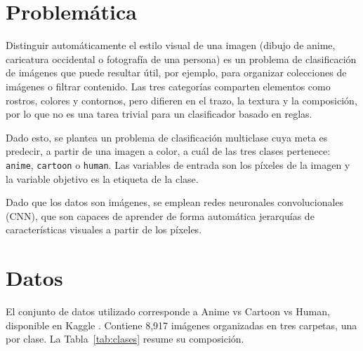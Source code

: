 \documentclass[letterpaper, 10 pt]{IEEEconf}
\begin{document}

\section{Problemática}

Distinguir automáticamente el estilo visual de una imagen (dibujo de anime, caricatura occidental o fotografía de una persona) es un problema de clasificación de imágenes que puede resultar útil, por ejemplo, para organizar colecciones de imágenes o filtrar contenido. Las tres categorías comparten elementos como rostros, colores y contornos, pero difieren en el trazo, la textura y la composición, por lo que no es una tarea trivial para un clasificador basado en reglas.

Dado esto, se plantea un problema de clasificación multiclase cuya meta es predecir, a partir de una imagen a color, a cuál de las tres clases pertenece: \texttt{anime}, \texttt{cartoon} o \texttt{human}. Las variables de entrada son los píxeles de la imagen y la variable objetivo es la etiqueta de la clase.

Dado que los datos son imágenes, se emplean redes neuronales convolucionales (CNN), que son capaces de aprender de forma automática jerarquías de características visuales a partir de los píxeles.


\section{Datos}

El conjunto de datos utilizado corresponde a Anime vs Cartoon vs Human, disponible en Kaggle \cite{dataset}. Contiene 8,917 imágenes organizadas en tres carpetas, una por clase. La Tabla~\ref{tab:clases} resume su composición.

\begin{table}[H]
\caption{Composición del conjunto de datos original}
\label{tab:clases}
\centering
\footnotesize
{}
\end{table}
\end{document}
